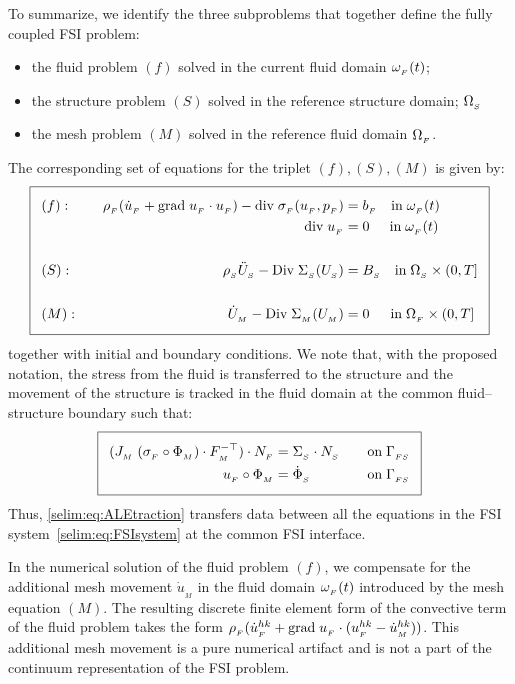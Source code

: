 To summarize, we identify the three subproblems that together define
the fully coupled FSI problem:
\begin{itemize}
\item
the fluid problem $(f)$ solved in the current fluid domain $\omega_{_{F}}(t)$;
\item
the structure problem $(S)$ solved in the reference structure domain;
$\Omega_{_{S}}$
\item
the mesh problem $(M)$ solved in the reference fluid domain $\Omega_{_{F}}$.
\end{itemize}
The corresponding set of equations for the triplet
$(f),(S),(M)$ is given by:
\begin{equation}
  \addtolength{\fboxsep}{5pt} \boxed{
    \begin{split}\label{selim:eq:FSIsystem}
   &(f):&\quad \rhoF(\dotuF + \graduF\cdot\uF) -
      \divv\sigmaF(\uF,\pF) =\;& \bff \quad
      \textrm{in}\;\oF(t)\\ &&\divv\uF =\;&
      0\:\:\quad\textrm{in}\;\oF(t) \\\\ &(S):&\quad \rhoS \ddotUS -
      \Divv \SigmaS(\US) =\;& \BS \quad \textrm{in}\; \OS\times
      (0,T]\\\\ &(M):&\quad \dot{U}_{_{M}} - \Divv \SigmaM(\UM) =\;& 0
  \;\:\quad\textrm{in}\; \OF\times (0,T]
    \end{split}
  }
\end{equation}
together with initial and boundary conditions. We note that, with the
proposed notation, the stress from the fluid is transferred to the
structure and the movement of the structure is tracked in the fluid
domain at the common fluid--structure boundary such that:
\begin{equation}
  \addtolength{\fboxsep}{5pt} \boxed{
    \begin{split}\label{selim:eq:ALEtraction}
      (J_{_{M}}\;(\sigmaF\circ\PhiM) \cdot F_{_{M}}^{-\top})\cdot
      N_{_{F}} &= \SigmaS\cdot N_{_{S}} \quad &\textrm{on}\; \Gamma_{_{FS}}\\
      \uF\circ\PhiM &= \dot{\Phi}_{_{S}} \quad &\textrm{on}\; \Gamma_{_{FS}}\\
    \end{split}
  }
\end{equation}
Thus, \eqref{selim:eq:ALEtraction} transfers data between all the
equations in the FSI system~\eqref{selim:eq:FSIsystem} at the common
FSI interface.

In the numerical solution of the fluid problem $(f)$,
we compensate for the additional mesh movement $\dot{u}_{_{M}}$ in the
fluid domain $\omega_{_{F}}(t)$ introduced by the mesh equation $(M)$.  The
resulting discrete finite element form of the convective term of the
fluid problem takes the form $\rho_{_{F}}(\dot{u}_{_{F}}^{hk} +
\textrm{grad}\;u_{_{F}}\cdot(u_{_{F}}^{hk} - \dot{u}_{_{M}}^{hk}))$.  This additional mesh
movement is a pure numerical artifact and is not a part of the
continuum representation of the FSI problem.

